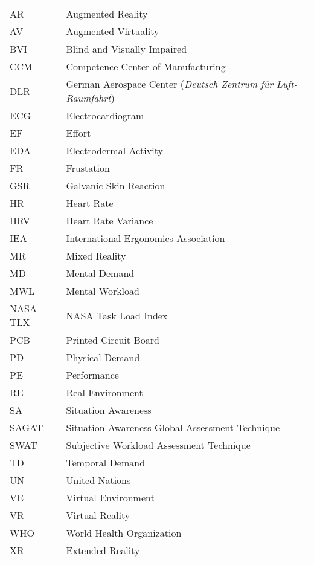 
\begin{longtable}{ll}

AR & Augmented Reality \\
AV & Augmented Virtuality \\
BVI & Blind and Visually Impaired \\
CCM & Competence Center of Manufacturing \\
DLR & German Aerospace Center (\textit{Deutsch Zentrum für Luft- Raumfahrt}) \\
ECG & Electrocardiogram \\
EF & Effort \\
EDA & Electrodermal Activity \\
FR & Frustation \\
GSR & Galvanic Skin Reaction \\
HR & Heart Rate \\
HRV & Heart Rate Variance \\
IEA & International Ergonomics Association \\
MR & Mixed Reality \\
MD & Mental Demand \\
MWL & Mental Workload \\
NASA-TLX & NASA Task Load Index \\
PCB & Printed Circuit Board \\
PD & Physical Demand \\
PE & Performance \\
RE & Real Environment \\
SA & Situation Awareness \\
SAGAT & Situation Awareness Global Assessment Technique \\
SWAT & Subjective Workload Assessment Technique \\
TD & Temporal Demand \\
UN & United Nations \\
VE & Virtual Environment \\
VR & Virtual Reality \\
WHO & World Health Organization \\
XR & Extended Reality \\


\end{longtable}

